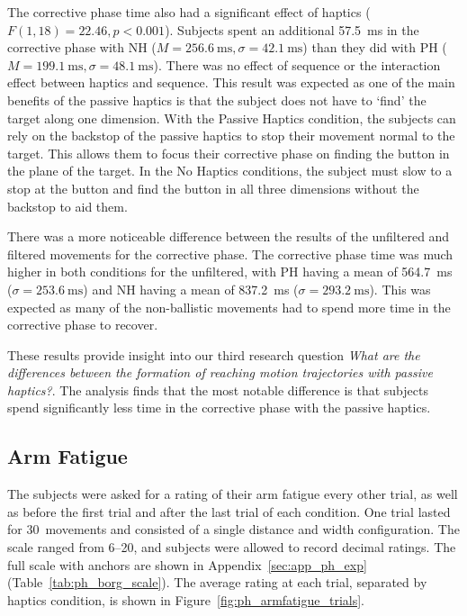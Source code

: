 The corrective phase time also had a significant effect of haptics ($F(1, 18)=22.46, p<0.001$).
Subjects spent an additional \SI{57.5}{\milli\second} in the corrective phase with NH ($M=\SI{256.6}{\milli\second}, \sigma=\SI{42.1}{\milli\second}$) than they did with PH ($M=\SI{199.1}{\milli\second}, \sigma=\SI{48.1}{\milli\second}$).
There was no effect of sequence or the interaction effect between haptics and sequence.
This result was expected as one of the main benefits of the passive haptics is that the subject does not have to `find' the target along one dimension.
With the Passive Haptics condition, the subjects can rely on the backstop of the passive haptics to stop their movement normal to the target.
This allows them to focus their corrective phase on finding the button in the plane of the target.
In the No Haptics conditions, the subject must slow to a stop at the button and find the button in all three dimensions without the backstop to aid them.

There was a more noticeable difference between the results of the unfiltered and filtered movements for the corrective phase.
The corrective phase time was much higher in both conditions for the unfiltered, with PH having a mean of \SI{564.7}{\milli\second} ($\sigma=\SI{253.6}{\milli\second}$) and NH having a mean of \SI{837.2}{\milli\second} ($\sigma=\SI{293.2}{\milli\second}$).
This was expected as many of the non-ballistic movements had to spend more time in the corrective phase to recover.

These results provide insight into our third research question \textit{What are the differences between the formation of reaching motion trajectories with passive haptics?}.
The analysis finds that the most notable difference is that subjects spend significantly less time in the corrective phase with the passive haptics.

\subsection{Arm Fatigue}

The subjects were asked for a rating of their arm fatigue every other trial, as well as before the first trial and after the last trial of each condition.
One trial lasted for 30~movements and consisted of a single distance and width configuration.
The scale ranged from \numrange{6}{20}, and subjects were allowed to record decimal ratings.
The full scale with anchors are shown in Appendix~\ref{sec:app_ph_exp} (Table~\ref{tab:ph_borg_scale}).
The average rating at each trial, separated by haptics condition, is shown in Figure~\ref{fig:ph_armfatigue_trials}.

